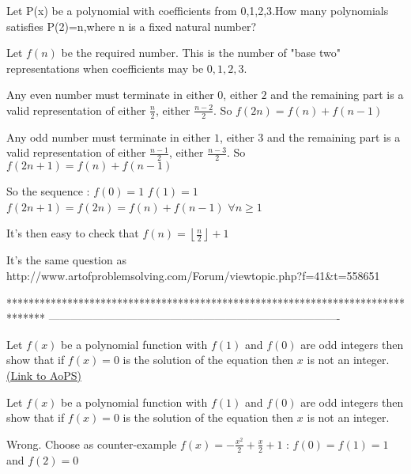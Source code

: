 \begin{solution}
	\begin{tcolorbox}Let P(x) be a polynomial with coefficients from {0,1,2,3}.How many polynomials satisfies P(2)=n,where n is a fixed natural number?\end{tcolorbox}
Let $f(n)$ be the required number.
This is the number of "base two" representations when coefficients may be $0,1,2,3$.

Any even number must terminate in either $0$, either $2$ and the remaining part is a valid representation of either $\frac n2$, either $\frac {n-2}2$.
So $f(2n)=f(n)+f(n-1)$

Any odd number must terminate in either $1$, either $3$ and the remaining part is a valid representation of either $\frac {n-1}2$, either $\frac {n-3}2$.
So $f(2n+1)=f(n)+f(n-1)$

So the sequence :
$f(0)=1$
$f(1)=1$
$f(2n+1)=f(2n)=f(n)+f(n-1)$ $\forall n\ge 1$

It's then easy to check that $\boxed{f(n)=\left\lfloor\frac n2\right\rfloor+1}$
\end{solution}



\begin{solution}
	It's the same question as http://www.artofproblemsolving.com/Forum/viewtopic.php?f=41&t=558651
\end{solution}
*******************************************************************************
-------------------------------------------------------------------------------

\begin{problem}
	Let $f(x)$ be a polynomial function with $f(1)$ and $f(0)$ are odd integers then show that if $f(x)=0$ is the solution of the equation then $x$ is not an integer.
	\flushright \href{https://artofproblemsolving.com/community/c6h562889}{(Link to AoPS)}
\end{problem}



\begin{solution}
	\begin{tcolorbox}Let $f(x)$ be a polynomial function with $f(1)$ and $f(0)$ are odd integers then show that if $f(x)=0$ is the solution of the equation then $x$ is not an integer.\end{tcolorbox}
Wrong. Choose as counter-example $f(x)=-\frac{x^2}2+\frac x2+1$ : $f(0)=f(1)=1$ and $f(2)=0$
\end{solution}



